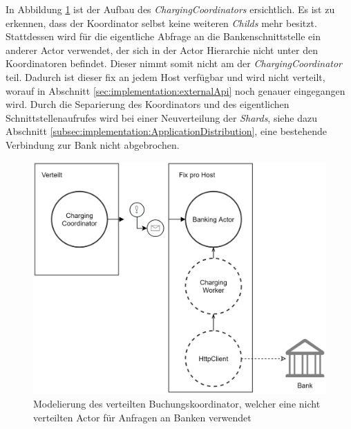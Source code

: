 In Abbildung \ref{fig:implementation:ChargingCoordinatorSample} ist der Aufbau des \textit{ChargingCoordinators} ersichtlich. Es ist zu erkennen, dass der Koordinator selbst keine weiteren \textit{Childs} mehr besitzt. Stattdessen wird für die eigentliche Abfrage an die Bankenschnittstelle ein anderer Actor verwendet, der sich in der Actor Hierarchie nicht unter den Koordinatoren befindet. Dieser nimmt somit nicht am  der \textit{ChargingCoordinator} teil. Dadurch ist dieser fix an jedem Host verfügbar und wird nicht verteilt, worauf in Abschnitt \ref{sec:implementation:externalApi} noch genauer eingegangen wird. Durch die Separierung des Koordinators und des eigentlichen Schnittstellenaufrufes wird bei einer Neuverteilung der \textit{Shards}, siehe dazu Abschnitt \ref{subsec:implementation:ApplicationDistribution}, eine bestehende Verbindung zur Bank nicht abgebrochen. 
\begin{figure}
    \centering
    \includegraphics[width=0.65\linewidth]{gfx/implementation/ChargingCoordinatorSample}
    \caption{Modelierung des verteilten Buchungskoordinator, welcher eine nicht verteilten Actor für Anfragen an Banken verwendet}
    \label{fig:implementation:ChargingCoordinatorSample}
\end{figure}


